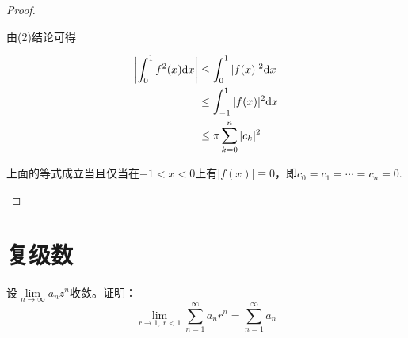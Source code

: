 \begin{proof}
\begin{enumerate}
        由\textup{(2)}结论可得

        \begin{align*}
            \left| \int_{0}^{1}{f^2(x)}\mathrm{d} x \right| & \leq \int_{0}^{1}{|f(x)|^2}\mathrm{d} x \\
            & \leq \int_{-1}^{1}{|f(x)|^2}\mathrm{d} x \\
            & \leq \pi \sum\limits_{k = 0}^{n}{|c_k|^2}
        \end{align*}

        上面的等式成立当且仅当在$-1 < x < 0$上有$|f(x)| \equiv 0$，即$c_0 = c_1 = \cdots = c_n = 0$. 

    \end{enumerate}

    
\end{proof}

\section{复级数}

\begin{proposition}

    设$\lim\limits_{n \to \infty}{a_nz^n}$收敛。证明：
    \[\lim\limits_{r \to 1, \ r < 1}{\sum\limits_{n = 1}^{\infty}{a_nr^n}} = \sum\limits_{n = 1}^{\infty}{a_n}\]

\end{proposition}

